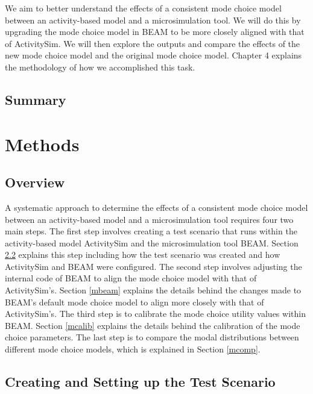 \documentclass[12pt, oneside, openright]{byuthesis}
\begin{document}
We aim to better understand the effects of a consistent mode choice model between an activity-based model and a microsimulation tool. We will do this by upgrading the mode choice model in BEAM to be more closely aligned with that of ActivitySim. We will then explore the outputs and compare the effects of the new mode choice model and the original mode choice model. Chapter 4 explains the methodology of how we accomplished this task.

\hypertarget{summary}{%
\section{Summary}\label{summary}}

\hypertarget{methods}{%
\chapter{Methods}\label{methods}}

\hypertarget{overview-1}{%
\section{Overview}\label{overview-1}}

A systematic approach to determine the effects of a consistent mode choice model between an activity-based model and a microsimulation tool requires four two main steps. The first step involves creating a test scenario that runs within the activity-based model ActivitySim and the microsimulation tool BEAM. Section \ref{mscen} explains this step including how the test scenario was created and how ActivitySim and BEAM were configured. The second step involves adjusting the internal code of BEAM to align the mode choice model with that of ActivitySim's. Section \ref{mbeam} explains the details behind the changes made to BEAM's default mode choice model to align more closely with that of ActivitySim's. The third step is to calibrate the mode choice utility values within BEAM. Section \ref{mcalib} explains the details behind the calibration of the mode choice parameters. The last step is to compare the modal distributions between different mode choice models, which is explained in Section \ref{mcomp}.

\hypertarget{mscen}{%
\section{Creating and Setting up the Test Scenario}\label{mscen}}
\end{document}
